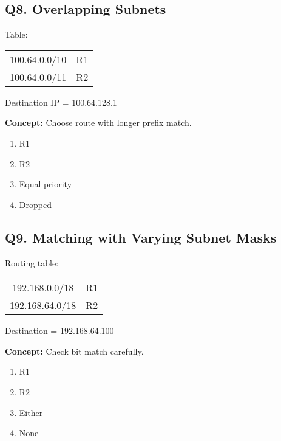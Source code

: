 
\subsection*{Q8. Overlapping Subnets}
Table:

\begin{table}[H]
\centering
\begin{tabular}{|c|c|}
\hline
100.64.0.0/10 & R1 \\
100.64.0.0/11 & R2 \\
\hline
\end{tabular}
\end{table}

Destination IP = 100.64.128.1

\textbf{Concept:} Choose route with longer prefix match.

\begin{enumerate}[label=(\alph*)]
\item R1 \quad \item R2 \quad \item Equal priority \quad \item Dropped
\end{enumerate}


\subsection*{Q9. Matching with Varying Subnet Masks}
Routing table:

\begin{table}[H]
\centering
\begin{tabular}{|c|c|}
\hline
192.168.0.0/18 & R1 \\
192.168.64.0/18 & R2 \\
\hline
\end{tabular}
\end{table}

Destination = 192.168.64.100

\textbf{Concept:} Check bit match carefully.

\begin{enumerate}[label=(\alph*)]
\item R1 \quad \item R2 \quad \item Either \quad \item None
\end{enumerate}


